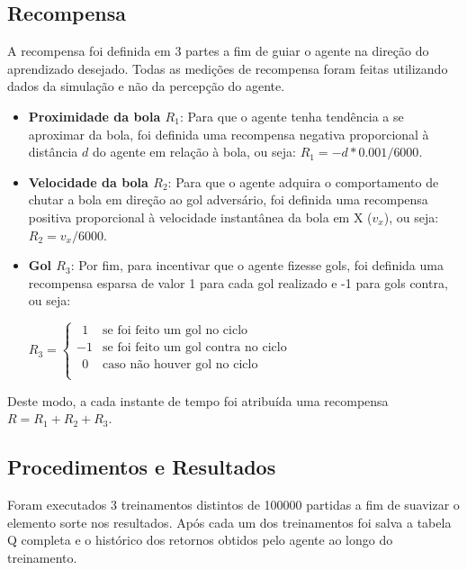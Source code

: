 \subsection{Recompensa}

A recompensa foi definida em 3 partes a fim de guiar o agente na direção do aprendizado desejado. Todas as medições de recompensa foram feitas utilizando dados da simulação e não da percepção do agente.

\begin{itemize}
	\item \textbf{Proximidade da bola $R_1$}: Para que o agente tenha tendência a se aproximar da bola, foi definida uma recompensa negativa proporcional à distância $d$ do agente em relação à bola, ou seja: $R_1 = -d*0.001/6000$.
	
	\item \textbf{Velocidade da bola $R_2$}: Para que o agente adquira o comportamento de chutar a bola em direção ao gol adversário, foi definida uma recompensa positiva proporcional à velocidade instantânea da bola em X ($v_x$), ou seja: $R_2 = v_x/6000$.
	
	\item \textbf{Gol $R_3$}: Por fim, para incentivar que o agente fizesse gols, foi definida uma recompensa esparsa de valor 1 para cada gol realizado e -1 para gols contra, ou seja:
	
	$
	R_3 =
	\left\{
	\begin{array}{ll}
		\ \ 1  & \mbox{se foi feito um gol no ciclo} \\
		-1  & \mbox{se foi feito um gol contra no ciclo} \\
		\ \ 0  & \mbox{caso não houver gol no ciclo} \\
	\end{array}
	\right.
	$
\end{itemize}

Deste modo, a cada instante de tempo foi atribuída uma recompensa $R = R_1 + R_2 + R_3$.

\subsection{Procedimentos e Resultados}

Foram executados 3 treinamentos distintos de 100000 partidas a fim de suavizar o elemento sorte nos resultados. Após cada um dos treinamentos foi salva a tabela Q completa e o histórico dos retornos obtidos pelo agente ao longo do treinamento.

